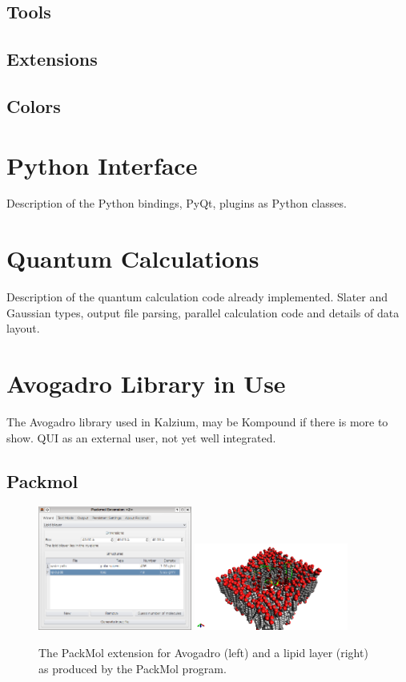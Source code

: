 \documentclass{article}
\begin{document}
\subsection{Tools}

\subsection{Extensions}

\subsection{Colors} %

\section{Python Interface} %

Description of the Python bindings, PyQt, plugins as Python classes.

\section{Quantum Calculations}

Description of the quantum calculation code already implemented. Slater and Gaussian types, output file parsing, parallel calculation code and details of data layout.

\section{Avogadro Library in Use}

The Avogadro library used in Kalzium, may be Kompound if there is more to show.
QUI as an external user, not yet well integrated.

\subsection{Packmol}

\begin{figure}
  \includegraphics[width=0.45\textwidth]{images/packmol-extension}
  \includegraphics[width=0.45\textwidth]{images/packmol-lipid}
  \caption{The PackMol extension for Avogadro (left) and a lipid layer (right) as
    produced by the PackMol program.}
  \label{f:packmol}
\end{figure}
\end{document}
